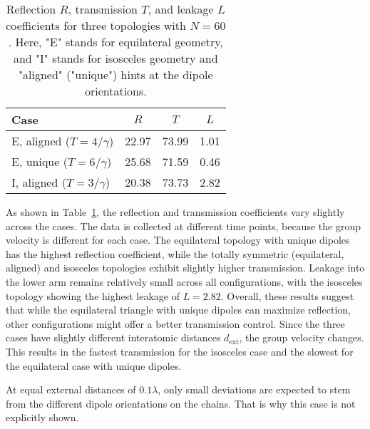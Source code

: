 \begin{table}[h!]
    \centering
    \caption{Reflection $R$, transmission $T$, and leakage $L$ coefficients for three topologies with $N = 60$.
    Here, "E" stands for equilateral geometry, and "I"
    stands for isosceles geometry and "aligned" ("unique") hints at the dipole orientations.}
    \begin{tabular}{@{}lccc@{}}
        \toprule
        \textbf{Case} & \textbf{$ R $} & \textbf{$ T $} & \textbf{$ L $} \\
        \midrule
        E, aligned ($T = 4 / \gamma$) & 22.97 & 73.99 & 1.01 \\
        E, unique ($T = 6 / \gamma$)    & 25.68 & 71.59 & 0.46 \\
        I, aligned ($T = 3 / \gamma$)   & 20.38 & 73.73 & 2.82 \\
        \bottomrule
    \end{tabular}
    \label{tab:coefficients_N_60}
\end{table}

\noindent
As shown in Table~\ref{tab:coefficients_N_60}, the reflection and transmission coefficients vary slightly across the cases.
The data is collected at different time points, because the group velocity is different for each case.
The equilateral topology with unique dipoles has the highest reflection coefficient, while the totally symmetric (equilateral, aligned) and isosceles topologies exhibit slightly higher transmission.
Leakage into the lower arm remains relatively small across all configurations, with the isosceles topology showing the highest leakage of $L = 2.82$.
Overall, these results suggest that while the equilateral triangle with unique dipoles can maximize reflection, other configurations might offer a better transmission control.
Since the three cases have slightly different interatomic distances \( d_\text{ext} \),
the group velocity changes.
This results in the fastest transmission for the isosceles case and the slowest for the equilateral case with unique dipoles.

\noindent
At equal external distances of $ 0.1 \lambda $,
only small deviations are expected to stem from the different dipole orientations on the chains.
That is why this case is not explicitly shown.




